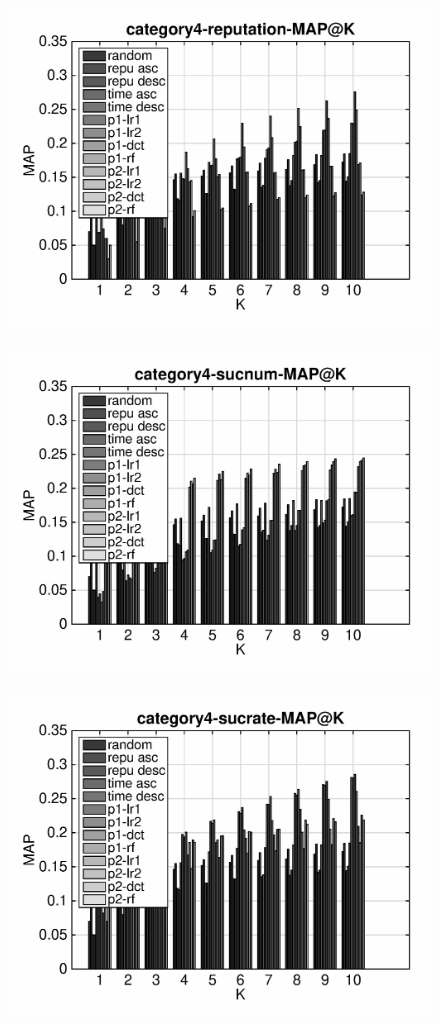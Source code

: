 \documentclass{article}
\begin{document}
\begin{figure}[ht]
\begin{flushleft}
\includegraphics[width=18cm,height=9cm]{category4-reputation-MAP@K.eps}
\includegraphics[width=18cm,height=9cm]{category4-sucnum-MAP@K.eps}
\includegraphics[width=18cm,height=9cm]{category4-sucrate-MAP@K.eps}
\end{flushleft}
\end{figure}
\end{document}
